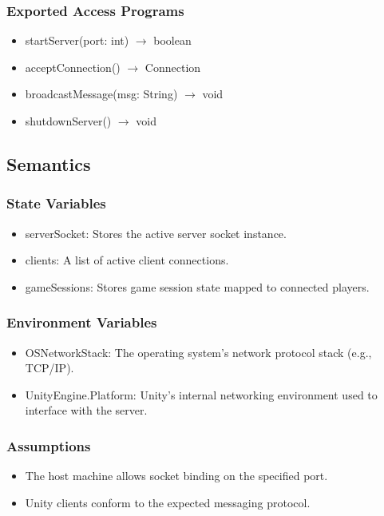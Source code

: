 \documentclass[12pt, titlepage]{article}
\begin{document}
\subsubsection{Exported Access Programs}
\begin{itemize}
    \item startServer(port: int) $\rightarrow$ boolean
    \item acceptConnection() $\rightarrow$ Connection
    \item broadcastMessage(msg: String) $\rightarrow$ void
    \item shutdownServer() $\rightarrow$ void
\end{itemize}

\subsection{Semantics}

\subsubsection{State Variables}
\begin{itemize}
    \item serverSocket: Stores the active server socket instance.
    \item clients: A list of active client connections.
    \item gameSessions: Stores game session state mapped to connected players.
\end{itemize}

\subsubsection{Environment Variables}
\begin{itemize}
    \item OSNetworkStack: The operating system’s network protocol stack (e.g., TCP/IP).
    \item UnityEngine.Platform: Unity’s internal networking environment used to interface with the server.
\end{itemize}

\subsubsection{Assumptions}
\begin{itemize}
    \item The host machine allows socket binding on the specified port.
    \item Unity clients conform to the expected messaging protocol.
\end{itemize}
\end{document}
